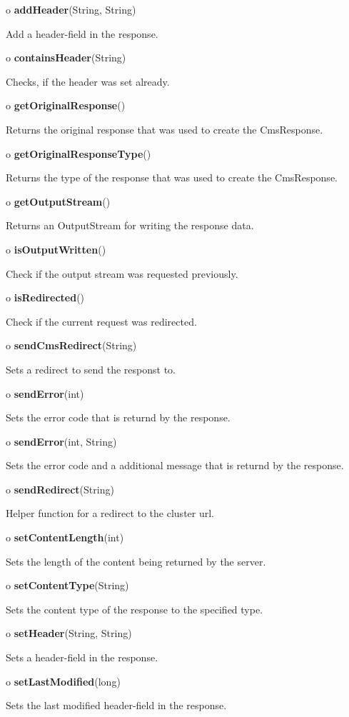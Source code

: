 \begin{description}
\item o {\bf addHeader}(String, String)  

Add a header-field in the response.  
\item o {\bf containsHeader}(String)  

Checks, if the header was set already.  
\item o {\bf getOriginalResponse}()  

Returns the original response that was used to create the CmsResponse.  
\item o {\bf getOriginalResponseType}()  

Returns the type of the response that was used to create the CmsResponse.  
\item o {\bf getOutputStream}()  

Returns an OutputStream for writing the response data.  
\item o {\bf isOutputWritten}()  

Check if the output stream was requested previously.  
\item o {\bf isRedirected}()  

Check if the current request was redirected.  
\item o {\bf sendCmsRedirect}(String)  

Sets a redirect to send the responst to.  
\item o {\bf sendError}(int)  

Sets the error code that is returnd by the response.  
\item o {\bf sendError}(int, String)  

Sets the error code and a additional message that is returnd by the response. 

\item o {\bf sendRedirect}(String)  

Helper function for a redirect to the cluster url.  
\item o {\bf setContentLength}(int)  

Sets the length of the content being returned by the server.  
\item o {\bf setContentType}(String)  

Sets the content type of the response to the specified type.  
\item o {\bf setHeader}(String, String)  

Sets a header-field in the response.  
\item o {\bf setLastModified}(long)  

Sets the last modified header-field in the response. 
\end{description}


